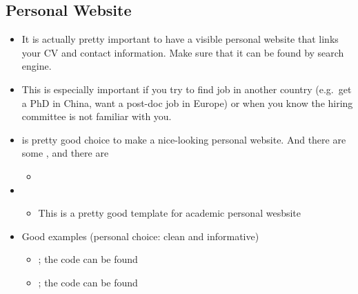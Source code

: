 \documentclass[letterpaper,10pt,english]{sphinxmanual}
\begin{document}
\subsection{Personal Website}
\label{\detokenize{resource/research/getting_started:personal-website}}\begin{itemize}
\item {} 
It is actually pretty important to have a visible personal website
that links your CV and contact information. Make sure that it can be
found by search engine.

\item {} 
This is especially important if you try to find job in another
country (e.g. get a PhD in China, want a post-doc job in Europe) or
when you know the hiring committee is not familiar with you.

\item {} 
 is pretty good choice to
make a nice-looking personal website. And there are some , and there
are 
\begin{itemize}
\item {} 

\end{itemize}

\item {} 
\begin{itemize}
\item {} 
This is a pretty good template for academic personal wesbsite

\end{itemize}

\item {} 
Good examples (personal choice: clean and informative)
\begin{itemize}
\item {} 
; the code can be found

\item {} 
; the code can be found

\end{itemize}

\end{itemize}
\end{document}

